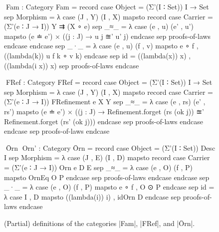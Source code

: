 \begin{figure}
\codefigure\small{}\baselineskip
\begin{code}
^^^Fam : Category
Fam = record
  case  Object    =  (Σ'(I ∶ Set)) I → Set
  sep   Morphism  =  λ case  (J , Y) (I , X) mapsto record
                               case  Carrier  = (Σ'(e ∶ J → I)) Y ⇉ (X ∘ e)
                               sep   _≈_      = λ case  (e , u) (e' , u') mapsto
                                                          (e ≐ e') × ((j : J) → u {j} ≊' u' {j}) endcase
                               sep  proofs-of-laws endcase endcase
  sep   _·_  = λ case (e , u) (f , v) mapsto e ∘ f , ((lambda({k})) u {f k} ∘ v {k}) endcase
  sep   id   =  ((lambda(x)) x) , ((lambda({i} x)) x)
  sep   proofs-of-laws endcase

^^^FRef : Category
FRef = record
  case  Object    =  (Σ'(I ∶ Set)) I → Set
  sep   Morphism  =  λ case  (J , Y) (I , X) mapsto record
                               case  Carrier  = (Σ'(e ∶ J → I)) FRefinement e X Y
                               sep   _≈_      = λ case  (e , rs) (e' , rs') mapsto
                                                          (e ≐ e') ×
                                                          ((j : J) →  Refinement.forget (rs   (ok j)) ≊'
                                                                      Refinement.forget (rs'  (ok j))) endcase
                               sep  proofs-of-laws endcase endcase
  sep   proofs-of-laws endcase

^^^Ōrn ^^^Orn' : Category
Ōrn = record
  case  Object    =  (Σ'(I ∶ Set)) Desc I
  sep   Morphism  =  λ case  (J , E) (I , D) mapsto record
                               case  Carrier  = (Σ'(e ∶ J → I)) Orn e D E
                               sep   _≈_      = λ case (e , O) (f , P) mapsto OrnEq O P endcase
                               sep  proofs-of-laws endcase endcase
  sep   _·_  =  λ case (e , O) (f , P) mapsto e ∘ f , O ⊙ P endcase
  sep   id   =  λ case {I , D} mapsto ((lambda(i)) i) , idOrn D endcase
  sep   proofs-of-laws endcase
\end{code}
\caption{(Partial) definitions of the categories |Fam|, |FRef|, and |Ōrn|.}
\label{fig:concrete-categories}
\end{figure}

